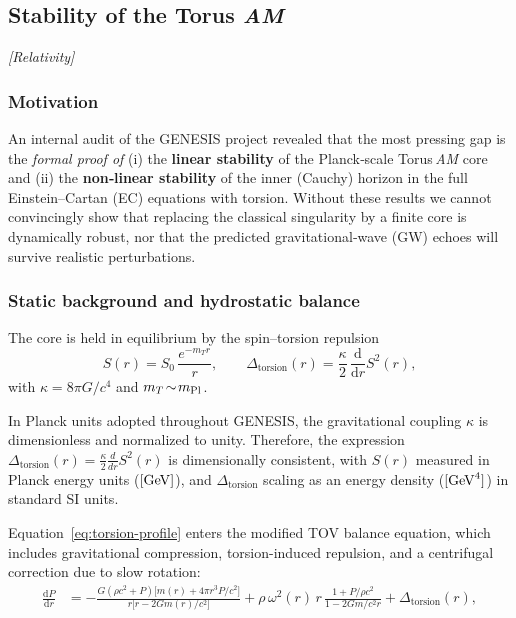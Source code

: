 \documentclass{article}
\newcommand{\grtag}{\textcolor{blue!40!black}{\textit{[Relativity]}}}
\begin{document}
\subsection{Stability of the Torus \textit{AM}}
\label{sec:TorusAM-stability}
\grtag

\subsubsection{Motivation}
An internal audit of the GENESIS project revealed that the most 
pressing gap is the \emph{formal proof of}  
(i) the \textbf{linear stability} of the Planck‑scale Torus\,\textit{AM} core  
and (ii) the \textbf{non‑linear stability} of the inner (Cauchy) horizon in the full
Einstein–Cartan (EC) equations with torsion.  
Without these results we cannot convincingly show that replacing the
classical singularity by a finite core is dynamically robust, nor that the
predicted gravitational‑wave (GW) echoes will survive realistic perturbations.

\subsubsection{Static background and hydrostatic balance}

The core is held in equilibrium by the spin–torsion repulsion  
\begin{equation}
  S(r)=S_{0}\,\frac{e^{-m_{T}r}}{r},\qquad
  \Delta_{\text{torsion}}(r)=\frac{\kappa}{2}\,
  \frac{\mathrm d}{\mathrm dr}S^{2}(r),
  \label{eq:torsion-profile}
\end{equation}
with $\kappa=8\pi G/c^{4}$ and $m_{T}\!\sim\!m_{\rm Pl}$.  

\begin{tcolorbox}[colback=gray!5!white, colframe=black!30, title=Dimensional Note]
In Planck units adopted throughout GENESIS, the gravitational coupling $\kappa$ is dimensionless and normalized to unity. Therefore, the expression
$\Delta_{\text{torsion}}(r) = \frac{\kappa}{2} \frac{d}{dr} S^2(r)$ is dimensionally consistent, with $S(r)$ measured in Planck energy units ($[{\rm GeV}]$), and $\Delta_{\text{torsion}}$ scaling as an energy density ($[{\rm GeV}^4]$) in standard SI units.
\end{tcolorbox}


Equation~\eqref{eq:torsion-profile} enters the modified TOV balance equation, which includes gravitational compression, torsion-induced repulsion, and a centrifugal correction due to slow rotation:
\begin{align}
\frac{\mathrm dP}{\mathrm dr} &=
-\frac{G(\rho c^{2}+P)\bigl[m(r)+4\pi r^{3}P/c^{2}\bigr]}
       {r\bigl[r-2Gm(r)/c^{2}\bigr]}
+\rho\,\omega^{2}(r)\,r\,
\frac{1+P/\rho c^{2}}{1-2Gm/c^{2}r}
+\Delta_{\text{torsion}}(r),
\end{align}
\end{document}
